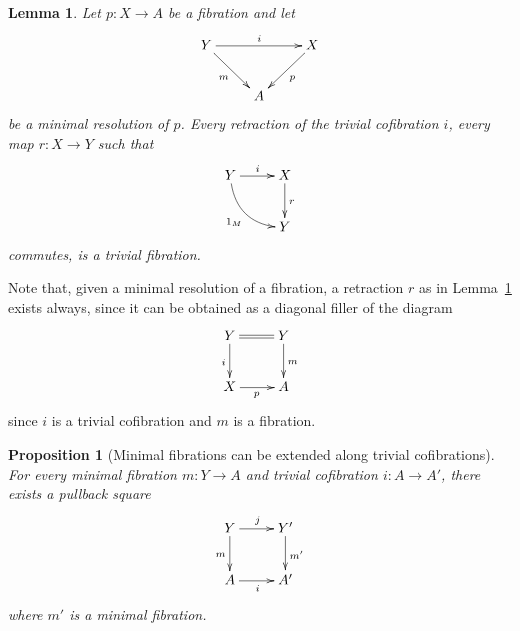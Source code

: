 \documentclass[reqno,10pt,a4paper,oneside]{amsart}
\newcommand{\ie}{\text{i.e.\ }}
\newtheorem{lemma}[theorem]{Lemma}
\newtheorem{proposition}[theorem]{Proposition}
\theoremstyle{definition}
\newcommand{\co}{\colon}
\begin{document}
\begin{lemma} \label{thm:minres} Let $p \co X \to A$ be a fibration and let
\[
\xymatrix{
Y \ar[rr]^{i} \ar[dr]_{m} & & X \ar[dl]^{p} \\
 & A & }
 \]
 be a minimal resolution of $p$. Every retraction of the trivial cofibration $i$, \ie every map $r \co X \to Y$ such that
\[
\xymatrix{
Y \ar[r]^{i} \ar@/_1pc/[dr]_{1_M} & X \ar[d]^r \\
 & Y }
 \]
commutes, is a trivial fibration.
 \end{lemma}

Note that, given a minimal resolution of a fibration, a retraction $r$  as in Lemma~\ref{thm:minres} exists always, since it can be obtained as
a diagonal filler of the diagram
\[
\xymatrix{
Y \ar@{=}[r] \ar[d]_{i} & Y \ar[d]^{m} \\
X \ar[r]_{p} & A }
\]
since $i$ is a trivial cofibration and $m$ is a fibration. 


\begin{proposition}[Minimal fibrations can be extended along trivial cofibrations]
\label{thm:minfibalongtrivcof}
 For every
minimal fibration $m \co Y \to A$ and trivial cofibration $i \co A \to A'$, there exists a pullback
square
\[
\xymatrix{
Y \ar[r]^{j} \ar[d]_m & Y' \ar[d]^{m'} \\
A \ar[r]_{i} & A'}
\]
where $m'$ is a minimal fibration. 
\end{proposition}
\end{document}
